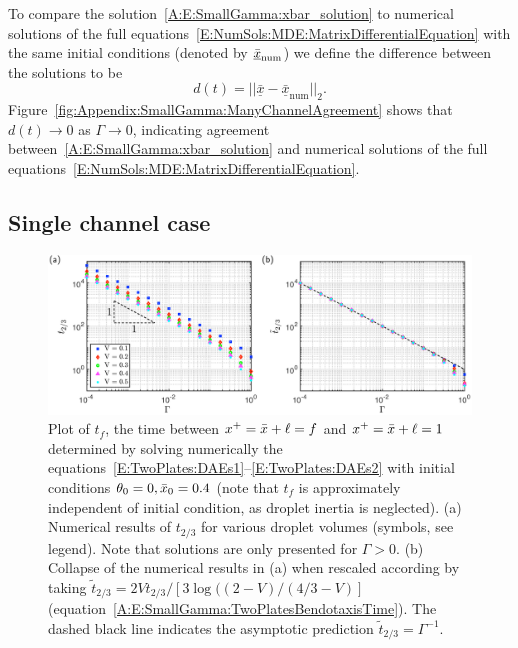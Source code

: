 \begin{subappendices}
\begin{equation}
\end{equation}
To compare the solution~\eqref{A:E:SmallGamma:xbar_solution} to numerical solutions of the full equations~\eqref{E:NumSols:MDE:MatrixDifferentialEquation} with the same initial conditions (denoted by $\underline{\bar{x}}_{\text{num}}$) we define the difference between the solutions to be
\begin{equation}
d(t) =  ||\underline{\bar{x}}- \underline{\bar{x}}_{\text{num}}||_2.
\end{equation}
Figure~\ref{fig:Appendix:SmallGamma:ManyChannelAgreement} shows that $d(t) \to 0$ as $\Gamma \to 0$, indicating agreement between~\eqref{A:E:SmallGamma:xbar_solution} and numerical solutions of the full equations~\eqref{E:NumSols:MDE:MatrixDifferentialEquation}.

\subsection{Single channel case}
\begin{figure}[t]
\centering
\includegraphics[width = \textwidth]{single_channel_Asymptotics_combined.pdf}
\caption{Plot of $t_f$, the time between $x^+ = \bar{x} + \ell = f$ and $x^+ = \bar{x} + \ell = 1$ determined by solving numerically the equations~\eqref{E:TwoPlates:DAEs1}--\eqref{E:TwoPlates:DAEs2} with initial conditions $\theta_0 = 0, \bar{x}_0 = 0.4$ (note that $t_f$ is approximately independent of initial condition, as droplet inertia is neglected). (a) Numerical results of $t_{2/3}$ for various droplet volumes (symbols, see legend). Note that solutions are only presented for $\Gamma > 0$. (b) Collapse of the numerical results in (a) when rescaled according by taking $\tilde{t}_{2/3} = 2Vt_{2/3}/\left[3 \log((2-V)/(4/3-V)\right]$ (equation~\eqref{A:E:SmallGamma:TwoPlatesBendotaxisTime}). The dashed black line indicates the asymptotic prediction  $\tilde{t}_{2/3}  = \Gamma^{-1}$.}\label{fig:Appendix:SmallGamma:SingleChannelAgreement}
\end{figure}


\end{subappendices}
